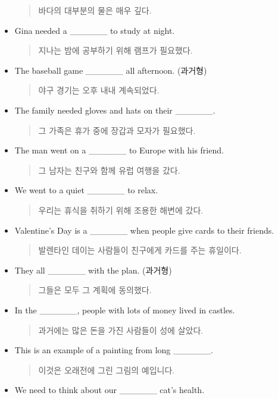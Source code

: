 \documentclass{article}
\begin{document}
\begin{addmargin}[1em]{1em}
\begin{itemize}
    \begin{quote}
    바다의 대부분의 물은 매우 깊다.
    \end{quote}
    \item Gina needed a \_\_\_\_\_\_ to study at night.
    \begin{quote}
    지나는 밤에 공부하기 위해 램프가 필요했다.
    \end{quote}
    \item The baseball game \_\_\_\_\_\_ all afternoon. (과거형)
    \begin{quote}
    야구 경기는 오후 내내 계속되었다.
    \end{quote}
    \item The family needed gloves and hats on their \_\_\_\_\_\_.
    \begin{quote}
    그 가족은 휴가 중에 장갑과 모자가 필요했다.
    \end{quote}
    \item The man went on a \_\_\_\_\_\_ to Europe with his friend.
    \begin{quote}
    그 남자는 친구와 함께 유럽 여행을 갔다.
    \end{quote}
    \newpage
    \item We went to a quiet \_\_\_\_\_\_ to relax.
    \begin{quote}
    우리는 휴식을 취하기 위해 조용한 해변에 갔다.
    \end{quote}
    \item Valentine's Day is a \_\_\_\_\_\_ when people give cards to their friends.
    \begin{quote}
    발렌타인 데이는 사람들이 친구에게 카드를 주는 휴일이다.
    \end{quote}
    \item They all \_\_\_\_\_\_ with the plan. (과거형)
    \begin{quote}
    그들은 모두 그 계획에 동의했다.
    \end{quote}
    \item In the \_\_\_\_\_\_, people with lots of money lived in castles.
    \begin{quote}
    과거에는 많은 돈을 가진 사람들이 성에 살았다.
    \end{quote}
    \item This is an example of a painting from long \_\_\_\_\_\_.
    \begin{quote}
    이것은 오래전에 그린 그림의 예입니다.
    \end{quote}
    \item We need to think about our \_\_\_\_\_\_ cat's health.

\end{itemize}
\end{addmargin}
\end{document}
